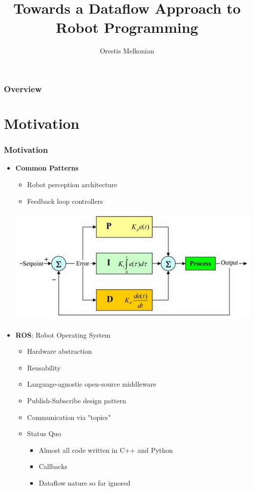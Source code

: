 \documentclass{beamer}
\title{Towards a Dataflow Approach to \\ Robot Programming}
\author{Orestis Melkonian}
\institute[UoA] {
	Software \& Knowledge Engineering Laboratory (SKEL)\\
	\medskip
	\textit{NCSR "Demokritos"}
}
\date{}
\begin{document}
\begin{frame} \titlepage \end{frame}

\begin{frame} \frametitle{Overview} \tableofcontents \end{frame}
\section{Motivation}
	\begin{frame}[allowframebreaks] \frametitle{Motivation}		
		\begin{itemize}
		\item \textbf{Common Patterns}
			\begin{itemize}
			\item Robot perception architecture
			\item Feedback loop controllers			
			\end{itemize}
			\medskip
			\center \includegraphics[scale=0.4,keepaspectratio]{pics/pid.jpg}						
		\end{itemize}
		\framebreak		
		\begin{itemize}
		\item \textbf{ROS}: Robot Operating System
			\begin{itemize}
			\item Hardware abstraction
			\item Reusability
			\item Language-agnostic open-source middleware
			\item Publish-Subscribe design pattern
			\item Communication via "topics"
			\item Status Quo
				\begin{itemize}
				\item Almost all code written in C++ and Python
				\item Callbacks			
				\item Dataflow nature so far ignored
				\end{itemize}					
			\end{itemize}
		\end{itemize}		
	\end{frame}
\end{document}
